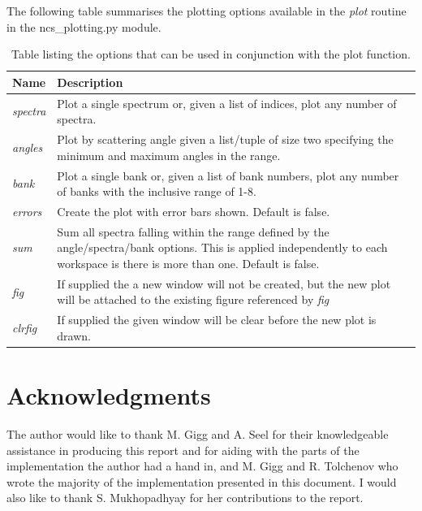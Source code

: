\documentclass[paper=a4, fontsize=11pt]{scrartcl}	%
\numberwithin{equation}{section}															%
\numberwithin{figure}{section}																%
\numberwithin{table}{section}
\begin{document}
\begin{appendices}
The following table summarises the plotting options available in the \textit{plot} routine in the ncs\_plotting.py module.
\begin{table}[H]
\centering
\begin{tabular}{ l p{15cm}}
Name & Description \\ \hline
\textit{spectra} & Plot a single spectrum or, given a list of indices, plot any number of spectra. \\ \hline
\textit{angles} & Plot by scattering angle given a list/tuple of size two specifying the minimum and maximum angles in the range. \\ \hline
\textit{bank} & Plot a single bank or, given a list of bank numbers, plot any number of banks with the inclusive range of 1-8. \\ \hline
\textit{errors} & Create the plot with error bars shown. Default is false. \\ \hline
\textit{sum} & Sum all spectra falling within the range defined by the angle/spectra/bank options. This is applied independently to each workspace is there is more than one. Default is false.\\ \hline
\textit{fig} & If supplied the a new window will not be created, but the new plot will be attached to the existing figure referenced by \textit{fig}\\ \hline
\textit{clrfig} & If supplied the given window will be clear before the new plot is drawn. \\ \hline
\end{tabular}
\caption{Table listing the options that can be used in conjunction with the plot function.}
\label{table:plotting-parameters}
\end{table}

\section*{Acknowledgments}
The author would like to thank M. Gigg and A. Seel for their knowledgeable assistance in producing this report and for aiding with the parts of the implementation the author had a hand in, and M. Gigg and R. Tolchenov who wrote the majority of the implementation presented in this document. I would also like to thank S. Mukhopadhyay for her contributions to the report.
\end{appendices}


\end{document}
